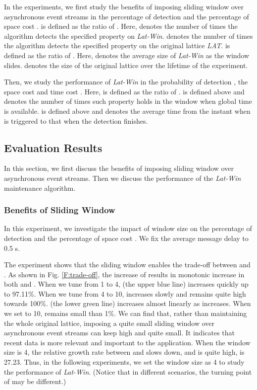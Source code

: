 \documentclass[12pt,journal,letterpaper,compsoc]{IEEEtran}
\begin{document}
In the experiments, we first study the benefits of imposing sliding window over asynchronous event streams in the percentage of detection  and the percentage of space cost .  is defined as the ratio of . Here,  denotes the number of times the algorithm detects the specified property on {\it Lat-Win}.  denotes the number of times the algorithm detects the specified property on the original lattice {\it LAT}.  is defined as the ratio of . Here,  denotes the average size of {\it Lat-Win} as the window slides.  denotes the size of the original lattice over the lifetime of the experiment.

Then, we study the performance of {\it Lat-Win} in the probability of detection , the space cost  and time cost . Here,  is defined as the ratio of .  is defined above and  denotes the number of times such property holds in the window when global time is available.  is defined above and  denotes the average time from the instant when  is triggered to that when the detection finishes.

\subsection{Evaluation Results}

In this section, we first discuss the benefits of imposing sliding window over asynchronous event streams. Then we discuss the performance of the {\it Lat-Win} maintenance algorithm.

\subsubsection{Benefits of Sliding Window}

In this experiment, we investigate the impact of window size  on the percentage of detection  and the percentage of space cost . We fix the average message delay to 0.5 s.

The experiment shows that the sliding window enables the trade-off between  and . As shown in Fig. \ref{F:trade-off}, the increase of  results in monotonic increase in both  and . When we tune  from 1 to 4,  (the upper blue line) increases quickly up to 97.11\%. When we tune  from 4 to 10,  increases slowly and remains quite high towards 100\%.  (the lower green line) increases almost linearly as  increases. When we set  to 10,  remains small than 1\%. We can find that, rather than maintaining the whole original lattice, imposing a quite small sliding window over asynchronous event streams can keep  high and  quite small. It indicates that recent data is more relevant and important to the application. When the window size is 4, the relative growth rate between  and  slows down, and  is quite high,  is 27.23.  Thus, in the following experiments, we set the window size  as 4 to study the performance of {\it Lat-Win}. (Notice that in different scenarios, the turning point of  may be different.)
\end{document}
